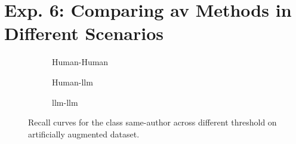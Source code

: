 \section{Exp. 6: Comparing \acs{av} Methods in Different Scenarios}
\label{sec:app_detection_scenarios}

%     


\begin{figure}[htbp]
  \centering
  \begin{subfigure}[b]{0.52\textwidth}
    \centering
    
    \caption{Human-Human}
    \label{fig:detec_scen_human-human_recall}
  \end{subfigure}
  \hfill
  \begin{subfigure}[b]{0.52\textwidth}
    \centering
    
    \caption{Human-\ac{llm}}
    \label{fig:detec_scen_human-llm_recall}
  \end{subfigure}
  \hfill
  \begin{subfigure}[b]{0.52\textwidth}
    \centering
    
    \caption{\ac{llm}-\ac{llm}}
    \label{fig:detec_scen_llm-llm_recall}
    \end{subfigure}
  \caption{Recall curves for the class same-author across different threshold on artificially augmented \dataStudent{} dataset.}
  \label{fig:detec_scen_recall}
\end{figure}
